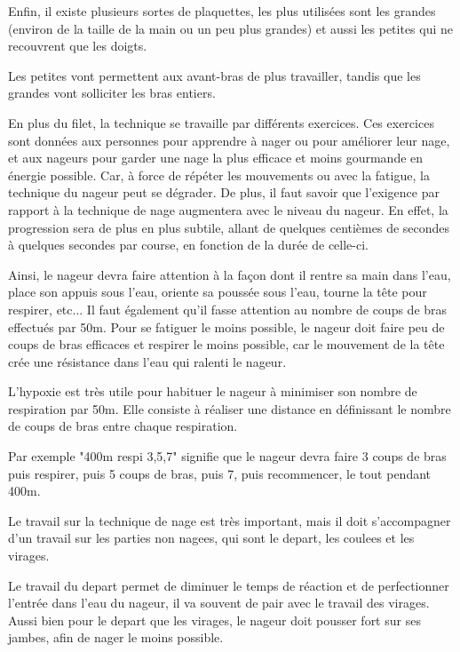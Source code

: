 \vspace{12pt}

Enfin, il existe plusieurs sortes de plaquettes, les plus utilisées sont les grandes (environ de la taille de la main ou un peu plus grandes) et aussi les petites qui ne recouvrent que les doigts.

Les petites vont permettent aux avant-bras de plus travailler, tandis que les grandes vont solliciter les bras entiers.

\vspace{12pt}

En plus du \gls{filet}, la technique se travaille par différents exercices. Ces exercices sont données aux personnes pour apprendre à nager ou pour améliorer leur nage, et aux nageurs pour garder une nage la plus efficace et moins gourmande en énergie possible. Car, à force de répéter les mouvements ou avec la fatigue, la technique du nageur peut se dégrader. De plus, il faut savoir que l'exigence par rapport à la technique de nage augmentera avec le niveau du nageur. En effet, la progression sera de plus en plus subtile, allant de quelques centièmes de secondes à quelques secondes par course, en fonction de la durée de celle-ci.

Ainsi, le nageur devra faire attention à la façon dont il rentre sa main dans l'eau, place son appuis sous l'eau, oriente sa poussée sous l'eau, tourne la tête pour respirer, etc... Il faut également qu'il fasse attention au nombre de coups de bras effectués par 50m. Pour se fatiguer le moins possible, le nageur doit faire peu de coups de bras efficaces et respirer le moins possible, car le mouvement de la tête crée une résistance dans l'eau qui ralenti le nageur.

L'hypoxie est très utile pour habituer le nageur à minimiser son nombre de respiration par 50m. Elle consiste à réaliser une distance en définissant le nombre de coups de bras entre chaque respiration. 

Par exemple "400m respi 3,5,7" signifie que le nageur devra faire 3 coups de bras puis respirer, puis 5 coups de bras, puis 7, puis recommencer, le tout pendant 400m. 

\vspace{12pt}

Le travail sur la technique de nage est très important, mais il doit s'accompagner d'un travail sur les \gls{parties non nagees}, qui sont le \gls{depart}, les \gls{coulees} et les \gls{virages}.

Le travail du \gls{depart} permet de diminuer le temps de réaction et de perfectionner l'entrée dans l'eau du nageur, il va souvent de pair avec le travail des \gls{virages}. Aussi bien pour le \gls{depart} que les \gls{virages}, le nageur doit pousser fort sur ses jambes, afin de nager le moins possible.


